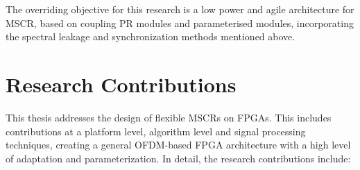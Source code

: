The overriding objective for this research is a low power and agile architecture for MSCR, based on coupling PR modules and parameterised modules, incorporating the spectral leakage and synchronization methods mentioned above.

\section{Research Contributions}

This thesis addresses the design of flexible MSCRs on FPGAs. This includes contributions at a platform level, algorithm level and signal processing techniques, creating a general OFDM-based FPGA architecture with a high level of adaptation and parameterization. In detail, the research contributions include:
